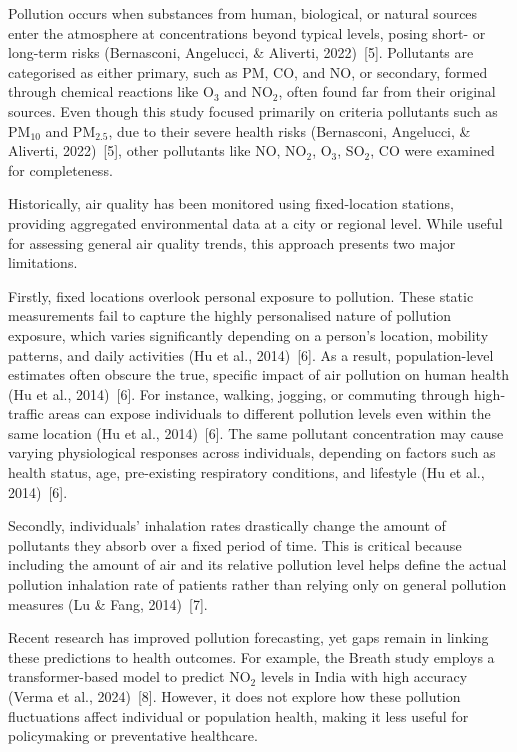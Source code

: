 \documentclass[12pt,a4paper]{report}
\begin{document}
Pollution occurs when substances from human, biological, or natural
sources enter the atmosphere at concentrations beyond typical levels,
posing short- or long-term risks (Bernasconi, Angelucci, \& Aliverti,
2022)~[5]. Pollutants are categorised as either primary, such as PM, CO,
and NO, or secondary, formed through chemical reactions like O$_3$ and
NO$_2$, often found far from their original sources. Even though this
study focused primarily on criteria pollutants such as PM$_{10}$ and
PM$_{2.5}$, due to their severe health risks (Bernasconi, Angelucci, \&
Aliverti, 2022)~[5], other pollutants like NO, NO$_2$, O$_3$, SO$_2$, CO
were examined for completeness.

Historically, air quality has been monitored using fixed-location
stations, providing aggregated environmental data at a city or regional
level. While useful for assessing general air quality trends, this
approach presents two major limitations.

Firstly, fixed locations overlook personal exposure to pollution. These
static measurements fail to capture the highly personalised nature of
pollution exposure, which varies significantly depending on a person's
location, mobility patterns, and daily activities (Hu et al., 2014)~[6].
As a result, population-level estimates often obscure the true, specific
impact of air pollution on human health (Hu et al., 2014)~[6]. For
instance, walking, jogging, or commuting through high-traffic areas can
expose individuals to different pollution levels even within the same
location (Hu et al., 2014)~[6]. The same pollutant concentration may
cause varying physiological responses across individuals, depending on
factors such as health status, age, pre-existing respiratory conditions,
and lifestyle (Hu et al., 2014)~[6].

Secondly, individuals’ inhalation rates drastically change the amount of
pollutants they absorb over a fixed period of time. This is critical
because including the amount of air and its relative pollution level
helps define the actual pollution inhalation rate of patients rather
than relying only on general pollution measures (Lu \& Fang, 2014)~[7].

Recent research has improved pollution forecasting, yet gaps remain in
linking these predictions to health outcomes. For example, the Breath
study employs a transformer-based model to predict NO$_2$ levels in
India with high accuracy (Verma et al., 2024)~[8]. However, it does not
explore how these pollution fluctuations affect individual or population
health, making it less useful for policymaking or preventative
healthcare.
\end{document}
